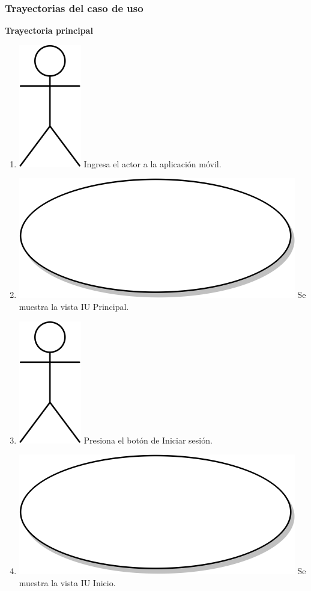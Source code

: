 \subsubsection{Trayectorias del caso de uso}
\textbf{Trayectoria principal}
\begin{enumerate}
 \item {\includegraphics[scale=.1]{Capitulo3/img/actor.png} Ingresa el actor a la aplicación móvil.}
\item {\includegraphics[scale=.05]{Capitulo3/img/proceso.png} Se muestra la vista IU Principal.}
\item {\includegraphics[scale=.1]{Capitulo3/img/actor.png} Presiona el botón de Iniciar sesión.}
\item {\includegraphics[scale=.05]{Capitulo3/img/proceso.png} Se muestra la vista IU Inicio.}

\end{enumerate}
